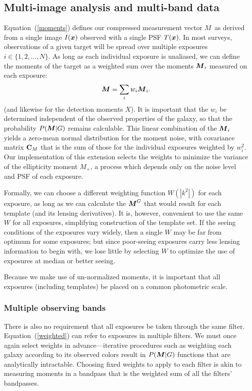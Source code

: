 \documentclass[11pt,preprint,flushrt]{aastex}
\def\eqq#1{Equation~(\ref{#1})}
\newcommand{\vecX}{\mbox{\boldmath $X$}}
\newcommand{\vecM}{\mbox{\boldmath $M$}}
\newcommand{\vecx}{\mbox{\boldmath $x$}}
\newcommand{\matC}{\mbox{$\bf C$}}
\newcommand\edit[1]{#1}
\begin{document}
\subsection{Multi-image analysis and multi-band data}
\eqq{moments} defines our compressed measurement vector \vecM\ as
derived from a single image $I(\vecx)$ observed with a single PSF
$T(\vecx)$.  In most surveys, observations of a given target will be
spread over multiple exposures $i\in\{1,2,\ldots,N\}.$ As long as each
individual exposure is unaliased, we can define the moments of the
target as a weighted sum over the moments $\vecM_i$ measured on each
exposure:
\begin{equation}
\label{weighted}
\vecM = \sum_i w_i \vecM_i.
\end{equation}
(and likewise for the detection moments \vecX).  It is important that
the $w_i$ be determined independent of the 
observed properties of the galaxy, so that the \edit{probability
$P(\vecM | G)$} remains calculable.  This linear combination of
the $\vecM_i$ yields a zero-mean normal distribution for the moment
noise, with covariance matrix $\matC_M$ that is the
sum of those for the individual exposures weighted by $w_i^2.$
Our implementation of this
extension selects the weights to minimize the variance of the
ellipticity moment $M_+$, a process which depends only on the noise
level and PSF of each exposure.

Formally, we can choose a different weighting function $W(|k^2|)$ for
each exposure, as long as we can calculate the $\vecM^G$ that would
result for each template (and its lensing derivatives).  
It is, however, convenient to use the same $W$ for all exposures, simplifying
construction of the template set.
If the seeing conditions of the exposures vary widely, then a single
$W$ may be far from optimum for some exposures; but since poor-seeing
exposures carry less lensing information to begin with, we lose little
by selecting $W$ to optimize the use of exposures at median or better seeing.

Because we make use of un-normalized moments, it is important that all
exposures (including templates) be placed on a common photometric
scale.

\subsubsection{Multiple observing bands}
\label{multiband}
There is also no requirement that all exposures be taken through the
same filter.  \eqq{weighted} can refer to exposures in multiple
filters.  We must once again select weights in
advance---iterative procedures such as weighting each galaxy according to 
its observed colors result in $P(\vecM | G)$ functions
that are analytically intractable.  Choosing fixed weights to apply to
each filter is akin to measuring moments in a bandpass that is
the weighted sum of all the filters' bandpasses.
\end{document}
